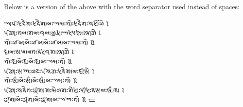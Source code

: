 \documentclass[12pt]{article}
\begin{document}
Below is a version of the above with the word 
separator used instead of spaces:
\bigskip

{\large\khoj 
𑈁𑈄𑈺𑈦𑈪𑈰𑈤𑈺𑈦𑈪𑈰𑈤𑈬𑈞𑈺𑈀𑈢𑈺𑈙𑈲𑈺𑈦𑈪𑈰𑈤𑈺𑈈𑈦𑈲𑈴𑈊𑈰 𑈸 \\
𑈄𑈐𑈮𑈺𑈙𑈞𑈺𑈤𑈞𑈺𑈛𑈞𑈺𑈊𑈯𑈦𑈯𑈺𑈀𑈦𑈟𑈘𑈺𑈈𑈮𑈐𑈰 𑈸 \\
𑈙𑈲𑈺𑈊𑈭𑈞𑈬𑈞𑈰𑈺𑈊𑈭𑈞𑈬𑈞𑈰𑈺𑈊𑈭𑈞𑈬𑈞𑈺𑈀𑈢𑈺𑈙𑈲 𑈹 \\
𑈜𑈬𑈞𑈺𑈩𑈉𑈬𑈨𑈙𑈺𑈪𑈦𑈛𑈤𑈺𑈈𑈮𑈐𑈰 𑈸 \\
𑈙𑈲𑈺𑈜𑈬𑈞𑈰𑈺𑈜𑈬𑈞𑈰𑈺𑈜𑈬𑈞𑈺𑈀𑈢𑈺𑈙𑈲 𑈹 \\
𑈄𑈐𑈮𑈺𑈩𑈡𑈺𑈊𑈔𑈺𑈄𑈈𑈐𑈺𑈦𑈪𑈰𑈤𑈬𑈞𑈺𑈜𑈮𑈩𑈰 𑈸 \\
𑈙𑈲𑈺𑈩𑈶𑈬𑈞𑈰𑈺𑈩𑈶𑈬𑈞𑈰𑈺𑈩𑈶𑈬𑈞𑈺𑈀𑈢𑈺𑈙𑈲 𑈹 \\
𑈄𑈐𑈮𑈺𑈈𑈪𑈰𑈙𑈺𑈂𑈤𑈬𑈤𑈺𑈢𑈰𑈊𑈤𑈺𑈤𑈰𑈦𑈬𑈺𑈟𑈮𑈦𑈺𑈪𑈩𑈞𑈺𑈩𑈶𑈬𑈪𑈬 𑈸 \\
𑈂𑈤𑈬𑈞𑈰𑈺𑈂𑈤𑈬𑈞𑈰𑈺𑈂𑈤𑈬𑈞𑈺𑈀𑈡𑈺𑈙𑈲 𑈹 𑈼 \\
}
\end{document}
